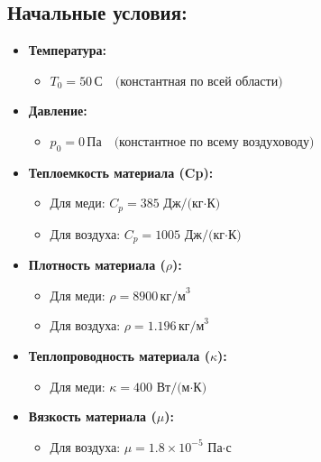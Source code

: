 \documentclass[a4paper,12pt]{article}
\theoremstyle{plain} %
\theoremstyle{definition} %
\theoremstyle{remark} %
\begin{document}
\subsection*{Начальные условия:}

\begin{itemize}
	\item \textbf{Температура:}
	      \begin{itemize}
		      \item $T_0 = 50 \, \text{С} \quad \text{(константная по всей области)}$
	      \end{itemize}
	      
	\item \textbf{Давление:}
	      \begin{itemize}
		      \item $p_0 = 0 \, \text{Па} \quad \text{(константное по всему воздуховоду)}$
	      \end{itemize}
	      
	\item \textbf{Теплоемкость материала (Cp):}
	      \begin{itemize}
		      \item Для меди: $C_p = 385 \, \text{Дж/(кг$\cdot$К)}$
		      \item Для воздуха: $C_p = 1005 \, \text{Дж/(кг$\cdot$К)}$
	      \end{itemize}
	      
	\item \textbf{Плотность материала ($\rho$):}
	      \begin{itemize}
		      \item Для меди: $\rho = 8900 \, \text{кг/м}^3$
		      \item Для воздуха: $\rho = 1.196 \, \text{кг/м}^3$
	      \end{itemize}
	      
	\item \textbf{Теплопроводность материала ($\kappa$):}
	      \begin{itemize}
		      \item Для меди: $\kappa = 400 \, \text{Вт/(м$\cdot$К)}$
	      \end{itemize}
	      
	\item \textbf{Вязкость материала ($\mu$):}
	      \begin{itemize}
		      \item Для воздуха: $\mu = 1.8 \times 10^{-5} \, \text{Па$\cdot$с}$
	      \end{itemize}
	      

\end{itemize}
\end{document}
